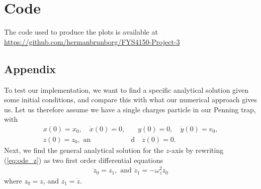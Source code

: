 \section*{Code}

The code used to produce the plots is available at \url{https://github.com/hermanbrunborg/FYS4150-Project-3}

\subsection{Appendix }

To test our implementation, we want to find a specific analytical solution given some initial conditions, and compare this with what our numerical approach gives us. Let us therefore assume we have a single charges particle in our Penning trap, with
%
\begin{align*}
x(0) = x_0, \quad \dot x(0) = 0, &\quad y(0) = 0, \quad \dot y(0) = v_0, \\
z(0) = z_0, \text{ an}&\text{d} \quad \dot z(0) = 0.
\end{align*}
%
Next, we find the general analytical solution for the $z$-axis by rewriting (\ref{eq:ode_z}) as two first order differential equations
%
\begin{align}
\dot z_0 = z_1, \text{ and } \dot z_1 = - \omega_z^2 z_0
\label{eq:ode_z_coupled}
\end{align}
%
where $z_0 = z$, and $z_1 = \dot z$. 
